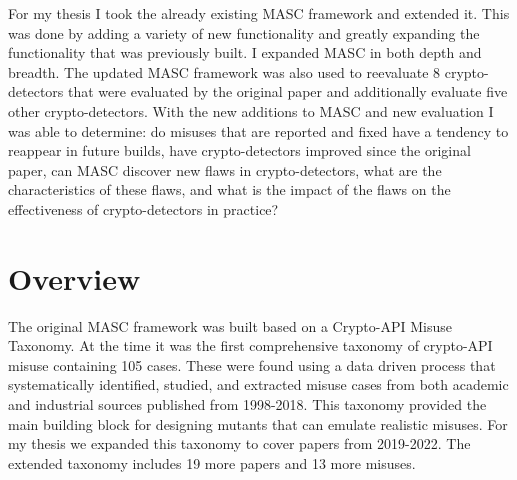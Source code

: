 For my thesis I took the already existing MASC framework and extended it. This was done by adding a variety of new functionality and greatly expanding the functionality that was previously built. I expanded MASC in both depth and breadth. The updated MASC framework was also used to reevaluate 8 crypto-detectors that were evaluated by the original paper and additionally evaluate five other crypto-detectors. With the new additions to MASC and new evaluation I was able to determine: do misuses that are reported and fixed have a tendency to reappear in future builds, have crypto-detectors improved since the original paper, can MASC discover new flaws in crypto-detectors, what are the characteristics of these flaws, and what is the impact of the flaws on the effectiveness of crypto-detectors in practice?



\section{Overview}
\label{ch1:sec:overview}


The original MASC framework was built based on a Crypto-API Misuse Taxonomy. At the time it was the first comprehensive taxonomy of crypto-API misuse containing 105 cases. These were found using a data driven process that systematically identified, studied, and extracted misuse cases from both academic and industrial sources published from 1998-2018. This taxonomy provided the main building block for designing mutants that can emulate realistic misuses. For my thesis we expanded this taxonomy to cover papers from 2019-2022. The extended taxonomy includes 19 more papers and 13 more misuses.

